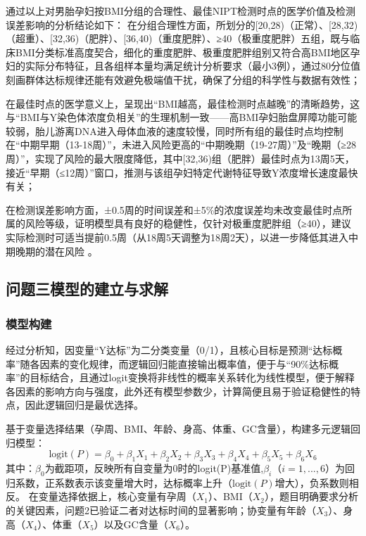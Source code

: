 \documentclass[withoutpreface,bwprint]{cumcmthesis} %
\begin{document}
通过以上对男胎孕妇按BMI分组的合理性、最佳NIPT检测时点的医学价值及检测误差影响的分析结论如下：
在分组合理性方面，所划分的[20,28)（正常）、[28,32)（超重）、[32,36)（肥胖）、[36,40)（重度肥胖）、≥40（极重度肥胖）五组，既与临床BMI分类标准高度契合，细化的重度肥胖、极重度肥胖组别又符合高BMI地区孕妇的实际分布特征，且各组样本量均满足统计分析要求（最小3例），通过80分位值刻画群体达标规律还能有效避免极端值干扰，确保了分组的科学性与数据有效性；

在最佳时点的医学意义上，呈现出“BMI越高，最佳检测时点越晚”的清晰趋势，这与“BMI与Y染色体浓度负相关”的生理机制一致——高BMI孕妇胎盘屏障功能可能较弱，胎儿游离DNA进入母体血液的速度较慢，同时所有组的最佳时点均控制在“中期早期（13-18周）”，未进入风险更高的“中期晚期（19-27周）”及“晚期（≥28周）”，实现了风险的最大限度降低，其中[32,36)组（肥胖）最佳时点为13周5天，接近“早期（≤12周）”窗口，推测与该组孕妇特定代谢特征导致Y浓度增长速度最快有关；

在检测误差影响方面，±0.5周的时间误差和±5\%的浓度误差均未改变最佳时点所属的风险等级，证明模型具有良好的稳健性，仅针对极重度肥胖组（≥40），建议实际检测时可适当提前0.5周（从18周5天调整为18周2天），以进一步降低其进入中期晚期的潜在风险 。




\subsection{问题三模型的建立与求解}
\subsubsection{模型构建}
经过分析知，因变量“Y达标”为二分类变量（0/1），且核心目标是预测“达标概率”随各因素的变化规律，而逻辑回归能直接输出概率值，便于与“90\%达标概率”的目标结合，且通过logit变换将非线性的概率关系转化为线性模型，便于解释各因素的影响方向与强度，此外还有模型参数少，计算简便且易于验证稳健性的特点，因此逻辑回归是最优选择。

基于变量选择结果（孕周、BMI、年龄、身高、体重、GC含量），构建多元逻辑回归模型：  
\begin{equation}
    \text{logit}(P) = \beta_0 + \beta_1X_1 + \beta_2X_2 + \beta_3X_3 + \beta_4X_4 + \beta_5X_5 + \beta_6X_6
\end{equation}
其中：$\beta_0$为截距项，反映所有自变量为0时的logit(P)基准值,$\beta_i$（$i=1,...,6$）为回归系数，正系数表示该变量增大时，达标概率上升（$\text{logit}(P)$增大），负系数则相反。  
在变量选择依据上，核心变量有孕周（$X_1$）、BMI（$X_2$），题目明确要求分析的关键因素，问题2已验证二者对达标时间的显著影响；协变量有年龄（$X_3$）、身高（$X_4$）、体重（$X_5$）以及GC含量（$X_6$）。  
\end{document}
